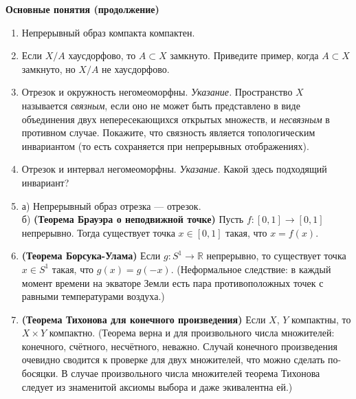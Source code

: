 \documentclass[a4paper]{article}
\begin{document}


\begin{center}
	\large{\textbf{Основные понятия (продолжение)}}
\end{center}
\begin{enumerate}
	\item Непрерывный образ компакта компактен.
	\item Если $X/A$ хаусдорфово, то $A\subset X$ замкнуто. Приведите пример, когда $A\subset X$ замкнуто, но $X/A$ не хаусдорфово.
	\item Отрезок и окружность негомеоморфны. \textit{Указание.} Пространство $X$ называется \textit{связным}, если оно не может быть представлено в виде объединения двух непересекающихся открытых множеств, и \textit{несвязным} в противном случае. Покажите, что связность является топологическим инвариантом (то есть сохраняется при непрерывных отображениях).
	\item Отрезок и интервал негомеоморфны. \textit{Указание.} Какой здесь подходящий инвариант?
	\item а) Непрерывный образ отрезка --- отрезок.\\
		б) \textbf{(Теорема Брауэра о неподвижной точке)} Пусть $f\colon[0,1]\to[0,1]$ непрерывно. Тогда существует точка $x\in[0,1]$ такая, что $x=f(x)$.
	\item \textbf{(Теорема Борсука-Улама)} Если $g\colon S^1\to\mathbb{R}$ непрерывно, то существует точка $x\in S^1$ такая, что $g(x)=g(-x)$. (Неформальное следствие: в каждый момент времени на экваторе Земли есть пара противоположных точек с равными температурами воздуха.)
	\item \textbf{(Теорема Тихонова для конечного произведения)} Если $X$, $Y$ компактны, то $X\times Y$ компактно. (Теорема верна и для произвольного числа множителей: конечного, счётного, несчётного, неважно. Случай конечного произведения очевидно сводится к проверке для двух множителей, что можно сделать по-босяцки. В случае произвольного числа множителей теорема Тихонова следует из знаменитой аксиомы выбора и даже экивалентна ей.)
\end{enumerate}
\end{document}
